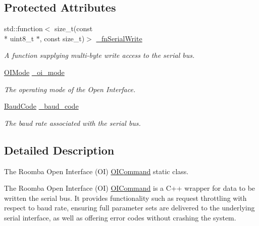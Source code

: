 \subsection*{Protected Attributes}
\begin{DoxyCompactItemize}
\item 
std\+::function$<$ size\+\_\+t(const \\*
uint8\+\_\+t $\ast$, const size\+\_\+t)$>$ \hyperlink{classroomba_1_1series500_1_1oi_1_1_o_i_command_aaf58f3199a9cf846e1a0e4858add8e77}{\+\_\+fn\+Serial\+Write}
\begin{DoxyCompactList}\small\item\em A function supplying multi-\/byte write access to the serial bus. \end{DoxyCompactList}\item 
\hyperlink{namespaceroomba_1_1series500_1_1oi_a8dde6b4ac23e862ae50868c3963d7063}{O\+I\+Mode} \hyperlink{classroomba_1_1series500_1_1oi_1_1_o_i_command_af68de62dce7922f17562c53b79c90488}{\+\_\+oi\+\_\+mode}
\begin{DoxyCompactList}\small\item\em The operating mode of the Open Interface. \end{DoxyCompactList}\item 
\hyperlink{namespaceroomba_1_1series500_1_1oi_ae5028fe52e1dabe309aff04a45581bfd}{Baud\+Code} \hyperlink{classroomba_1_1series500_1_1oi_1_1_o_i_command_ac6d9a7a7c15f2fcf2b865742e6832e8f}{\+\_\+baud\+\_\+code}
\begin{DoxyCompactList}\small\item\em The baud rate associated with the serial bus. \end{DoxyCompactList}\end{DoxyCompactItemize}


\subsection{Detailed Description}
The Roomba Open Interface (O\+I) \hyperlink{classroomba_1_1series500_1_1oi_1_1_o_i_command}{O\+I\+Command} static class. 

The Roomba Open Interface (O\+I) \hyperlink{classroomba_1_1series500_1_1oi_1_1_o_i_command}{O\+I\+Command} is a C++ wrapper for data to be written the serial bus. It provides functionality such as request throttling with respect to baud rate, ensuring full parameter sets are delivered to the underlying serial interface, as well as offering error codes without crashing the system. 

